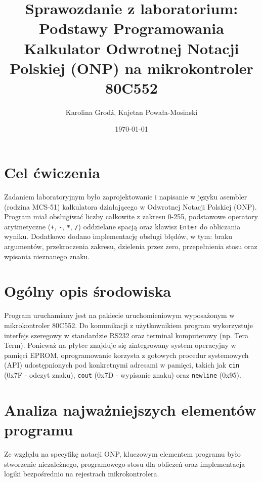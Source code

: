 \documentclass[11pt, a4paper]{article}
\title{\textbf{Sprawozdanie z laboratorium: Podstawy Programowania}\\Kalkulator Odwrotnej Notacji Polskiej (ONP) na mikrokontroler 80C552}
\author{Karolina Grodź, Kajetan Powała-Mosinski}
\date{\today}
\begin{document}
\maketitle

\section{Cel ćwiczenia}
Zadaniem laboratoryjnym było zaprojektowanie i napisanie w języku asembler (rodzina MCS-51) kalkulatora działającego w Odwrotnej Notacji Polskiej (ONP). Program miał obsługiwać liczby całkowite z zakresu 0-255, podstawowe operatory arytmetyczne (\texttt{+}, \texttt{-}, \texttt{*}, \texttt{/}) oddzielane spacją oraz klawisz \texttt{Enter} do obliczania wyniku. Dodatkowo dodano implementację obsługi błędów, w tym: braku argumentów, przekroczenia zakresu, dzielenia przez zero, przepełnienia stosu oraz wpisania nieznanego znaku.

\section{Ogólny opis środowiska}
Program uruchamiany jest na pakiecie uruchomieniowym wyposażonym w mikrokontroler 80C552. Do komunikacji z użytkownikiem program wykorzystuje interfejs szeregowy w standardzie RS232 oraz terminal komputerowy (np. Tera Term). Ponieważ na płytce znajduje się zintegrowany system operacyjny w pamięci EPROM, oprogramowanie korzysta z gotowych procedur systemowych (API) udostępnionych pod konkretnymi adresami w pamięci, takich jak \texttt{cin} (0x7F - odczyt znaku), \texttt{cout} (0x7D - wypisanie znaku) oraz \texttt{newline} (0x95).

\section{Analiza najważniejszych elementów programu}
Ze względu na specyfikę notacji ONP, kluczowym elementem programu było stworzenie niezależnego, programowego stosu dla obliczeń oraz implementacja logiki bezpośrednio na rejestrach mikrokontrolera.
\end{document}
